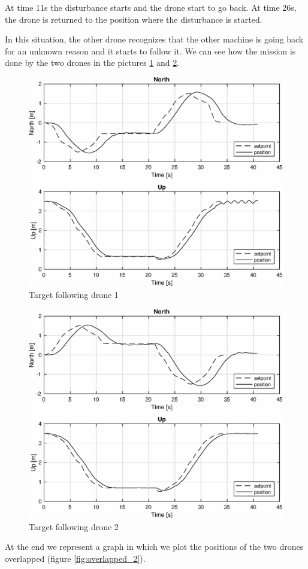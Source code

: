 At time 11s the disturbance starts and the drone start to go back. At time 26s,
the drone is returned to the position where the disturbance is started.

In this situation, the other drone recognizes that the other machine is going back
for an unknown reason and it starts to follow it. We can see how the mission is done
by the two drones in the pictures \ref{fig:following_1_2} and \ref{fig:following_2_2}.

\begin{figure}
\centering
\includegraphics[width=0.7\linewidth]{chapters/chapter-04/figures/following_1_1.eps}
\caption{Target following drone 1}
\label{fig:following_1_2}
\end{figure}

\begin{figure}
\centering
\includegraphics[width=0.7\linewidth]{chapters/chapter-04/figures/following_2_1.eps}
\caption{Target following drone 2}
\label{fig:following_2_2}
\end{figure}

At the end we represent a graph in which we plot the positions of the two drones overlapped
(figure \ref{fig:overlapped_2}).

